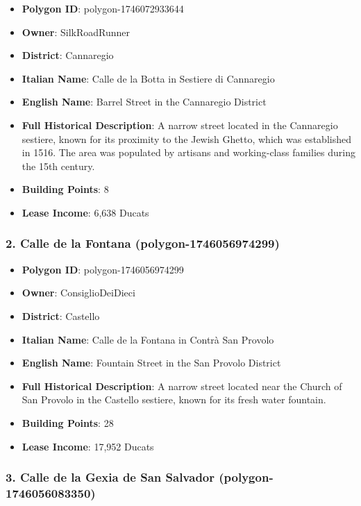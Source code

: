 \documentclass[11pt,a4paper]{article}
\begin{document}
\begin{itemize}
\item \textbf{Polygon ID}: polygon-1746072933644
\item \textbf{Owner}: SilkRoadRunner
\item \textbf{District}: Cannaregio
\item \textbf{Italian Name}: Calle de la Botta in Sestiere di Cannaregio
\item \textbf{English Name}: Barrel Street in the Cannaregio District
\item \textbf{Full Historical Description}: A narrow street located in the Cannaregio sestiere, known for its proximity to the Jewish Ghetto, which was established in 1516. The area was populated by artisans and working-class families during the 15th century.
\item \textbf{Building Points}: 8
\item \textbf{Lease Income}: 6,638 Ducats
\end{itemize}

\subsubsection{2. Calle de la Fontana (polygon-1746056974299)}

\begin{itemize}
\item \textbf{Polygon ID}: polygon-1746056974299
\item \textbf{Owner}: ConsiglioDeiDieci
\item \textbf{District}: Castello
\item \textbf{Italian Name}: Calle de la Fontana in Contrà San Provolo
\item \textbf{English Name}: Fountain Street in the San Provolo District
\item \textbf{Full Historical Description}: A narrow street located near the Church of San Provolo in the Castello sestiere, known for its fresh water fountain.
\item \textbf{Building Points}: 28
\item \textbf{Lease Income}: 17,952 Ducats
\end{itemize}

\subsubsection{3. Calle de la Gexia de San Salvador (polygon-1746056083350)}
\end{document}
